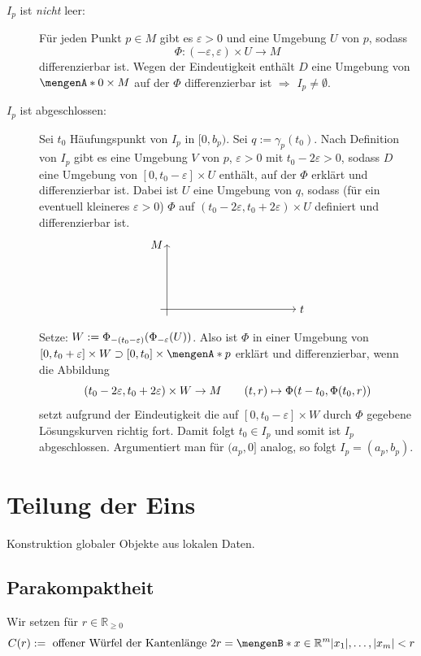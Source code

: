 \begin{description}
	\item[$I_p$ ist \emph{nicht} leer:] Für jeden Punkt $p \in M$ gibt es $\varepsilon >0$ und eine Umgebung $U$ von $p$, sodass 
	\[
		\Phi  : (-\varepsilon, \varepsilon)\times U \to M
	\]
	differenzierbar ist. Wegen der Eindeutigkeit enthält $D$ eine Umgebung von $\set{0} \times M $ auf der $\Phi$ differenzierbar ist $\Rightarrow $ $I_p \not= \emptyset$.
	\item[$I_p$ ist abgeschlossen:] Sei $t_0$ Häufungspunkt von $I_p$ in $[0,b_p)$. Sei $q := \gamma_p(t_0)$. Nach Definition von $I_p$ gibt es eine Umgebung $V$ von $p$,
	$\varepsilon >0$ mit $t_0- 2 \varepsilon >0$, sodass $D$ eine Umgebung von $[0,t_0-\varepsilon] \times U$ enthält, auf der $\Phi$ erklärt und differenzierbar ist.
	Dabei ist $U$ eine Umgebung von $q$, sodass (für ein eventuell kleineres $\varepsilon>0$) $\Phi $ auf $(t_0 - 2 \varepsilon, t_0 + 2 \varepsilon) \times U$ definiert
	und differenzierbar ist.
	\[
		\begin{tikzpicture}
			\draw[->] (-0.2,0) -- (4,0) node[right]{$t$};
			\draw[->] (0,-0.2) -- (0,2) node[left]{$M$};
		\end{tikzpicture}
	\]
	Setze: $W := \Phi_{-(t_0-\varepsilon)} \enbrace*{\Phi _{-\varepsilon} (U)} $. Also ist $\Phi$ in einer Umgebung von 
	$[0,t_0+\varepsilon] \times W \supset [0,t_0] \times \set{p}$ erklärt und differenzierbar, wenn die Abbildung 
	\[
		(t_0 - 2 \varepsilon, t_0 + 2 \varepsilon) \times  W \to M \qquad (t,r) \mapsto \Phi  \enbrace*{t-t_0, \Phi(t_0,r)} 
	\]
	setzt aufgrund der Eindeutigkeit die auf $[0,t_0 -\varepsilon] \times W$ durch $\Phi $ gegebene Lösungskurven richtig fort. Damit folgt $t_0 \in I_p$ und somit ist
	$I_p$ abgeschlossen. Argumentiert man für $(a_p,0]$ analog, so folgt $I_p = (a_p, b_p)$. \bewende
\end{description}
\newpage

\section{Teilung der Eins} %
\label{sec:3}
Konstruktion globaler Objekte aus lokalen Daten.

\subsection{Parakompaktheit} %
\label{sub:31}
Wir setzen für $r \in \mathds{R}_{\ge0}$
\[
	C(r) := \text{ offener Würfel der Kantenlänge }2r = \set[x \in \mathds{R}^m]{\abs*{x_1}, \ldots , \abs*{x_m} < r  } 
\]
